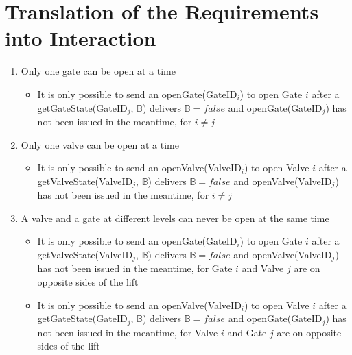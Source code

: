 \section{Translation of the Requirements into Interaction}

\begin{enumerate}
	\item Only one gate can be open at a time
		\begin{itemize}
			\item It is only possible to send an openGate(GateID$_i$) to open Gate $i$ after a getGateState(GateID$_j$, $ \mathbb{B} $) delivers $\mathbb{B} = false$ and openGate(GateID$_j$) has not been issued in the meantime, for $i \neq j$
		\end{itemize}
	
	\item Only one valve can be open at a time
	
		\begin{itemize}
			\item It is only possible to send an openValve(ValveID$_i$) to open Valve $i$ after a getValveState(ValveID$_j$, $ \mathbb{B} $) delivers $\mathbb{B} = false$ and openValve(ValveID$_j$) has not been issued in the meantime, for $i \neq j$
		\end{itemize}
	
	\item A valve and a gate at different levels can never be open at the same time
		\begin{itemize}
			\item It is only possible to send an openGate(GateID$_i$) to open Gate $i$ after a getValveState(ValveID$_j$, $ \mathbb{B} $) delivers $\mathbb{B} = false$ and openValve(ValveID$_j$) has not been issued in the meantime, for Gate $i$ and Valve $j$ are on opposite sides of the lift 
			\item It is only possible to send an openValve(ValveID$_i$) to open Valve $i$ after a getGateState(GateID$_j$, $ \mathbb{B} $) delivers $\mathbb{B} = false$ and openGate(GateID$_j$) has not been issued in the meantime, for Valve $i$ and Gate $j$ are on opposite sides of the lift
		\end{itemize}
	
	

\end{enumerate}
